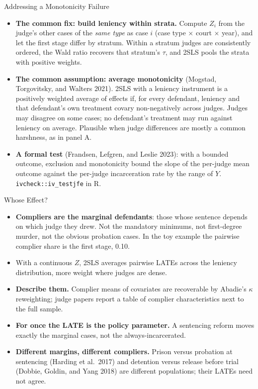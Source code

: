 \documentclass[aspectratio=169,11pt,xcolor=dvipsnames]{beamer}
\newcommand{\srcp}[1]{{\scriptsize\color{gray}(#1)}}
\begin{document}
\begin{frame}{Addressing a Monotonicity Failure}
\begin{itemize}\itemsep4pt
  \item \textbf{The common fix: build leniency within strata.} Compute $Z_i$
        from the judge's other cases of the \emph{same type} as case $i$ (case
        type $\times$ court $\times$ year), and let the first stage differ by
        stratum. Within a stratum judges are consistently ordered, the Wald
        ratio recovers that stratum's $\tau$, and 2SLS pools the strata with
        positive weights.
  \item \textbf{The common assumption: average monotonicity}
        \srcp{Mogstad, Torgovitsky, and Walters 2021}. 2SLS with a leniency
        instrument is a positively weighted average of effects if, for every
        defendant, leniency and that defendant's own treatment covary
        non-negatively across judges. Judges may disagree on some cases; no
        defendant's treatment may run against leniency on average. Plausible
        when judge differences are mostly a common harshness, as in panel A.
  \item \textbf{A formal test} \srcp{Frandsen, Lefgren, and Leslie 2023}: with a
        bounded outcome, exclusion and monotonicity bound the slope of the
        per-judge mean outcome against the per-judge incarceration rate by the
        range of $Y$. \texttt{ivcheck::iv\_testjfe} in R.
\end{itemize}
\end{frame}

\begin{frame}{Whose Effect?}
\begin{itemize}\itemsep3pt
  \item \textbf{Compliers are the marginal defendants}: those whose sentence
        depends on which judge they drew. Not the mandatory minimums, not
        first-degree murder, not the obvious probation cases. In the toy
        example the pairwise complier share is the first stage, 0.10.
  \item With a continuous $Z$, 2SLS averages pairwise LATEs across the leniency
        distribution, more weight where judges are dense.
  \item \textbf{Describe them.} Complier means of covariates are recoverable
        by Abadie's $\kappa$ reweighting; judge papers report a table of
        complier characteristics next to the full sample.
  \item \textbf{For once the LATE is the policy parameter.} A sentencing
        reform moves exactly the marginal cases, not the always-incarcerated.
  \item \textbf{Different margins, different compliers.} Prison versus
        probation at sentencing \srcp{Harding et al.\ 2017} and detention
        versus release before trial \srcp{Dobbie, Goldin, and Yang 2018} are
        different populations; their LATEs need not agree.
\end{itemize}
\end{frame}
\end{document}
